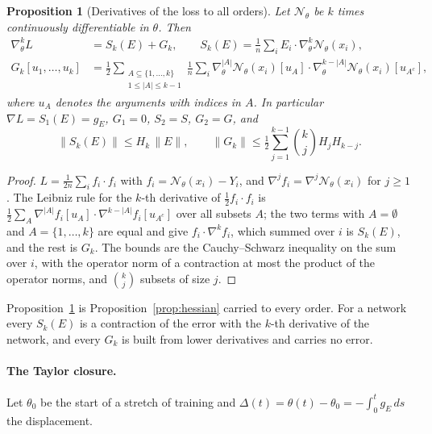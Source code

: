 \documentclass[11pt]{article}
\newtheorem{proposition}{Proposition}
\theoremstyle{definition}
\theoremstyle{remark}
\newcommand{\Net}{\mathcal{N}_\theta}    %
\begin{document}
\begin{proposition}[Derivatives of the loss to all orders]\label{prop:lossderiv}
Let $\Net$ be $k$ times continuously differentiable in $\theta$.
Then
\begin{equation}\label{eq:lossderiv}
\begin{aligned}
\nabla^k_\theta L &= S_k(E) + G_k,\qquad
S_k(E) = \tfrac1n\sum_iE_i\cdot\nabla^k_\theta\Net(x_i),\\
G_k[u_1,\dots,u_k] &= \tfrac12\sum_{\substack{A\subseteq\{1,\dots,k\}\\ 1\le|A|\le k-1}}\tfrac1n\sum_i\nabla^{|A|}_\theta\Net(x_i)[u_A]\cdot\nabla^{k-|A|}_\theta\Net(x_i)[u_{A^c}],
\end{aligned}
\end{equation}
where $u_A$ denotes the arguments with indices in $A$.
In particular $\nabla L = S_1(E) = g_E$, $G_1 = 0$, $S_2 = S$, $G_2 = G$, and
\begin{equation}\label{eq:lossderivbound}
\|S_k(E)\|\le H_k\,\|E\|,\qquad \|G_k\|\le\tfrac12\sum_{j=1}^{k-1}\binom kj H_jH_{k-j} .
\end{equation}
\end{proposition}

\begin{proof}
$L = \frac1{2n}\sum_if_i\cdot f_i$ with $f_i = \Net(x_i) - Y_i$, and $\nabla^jf_i = \nabla^j\Net(x_i)$ for $j\ge1$.
The Leibniz rule for the $k$-th derivative of $\frac12f_i\cdot f_i$ is $\frac12\sum_{A}\nabla^{|A|}f_i[u_A]\cdot\nabla^{k-|A|}f_i[u_{A^c}]$ over all subsets $A$; the two terms with $A = \emptyset$ and $A = \{1,\dots,k\}$ are equal and give $f_i\cdot\nabla^kf_i$, which summed over $i$ is $S_k(E)$, and the rest is $G_k$.
The bounds are the Cauchy--Schwarz inequality on the sum over $i$, with the operator norm of a contraction at most the product of the operator norms, and $\binom kj$ subsets of size $j$.
\end{proof}

Proposition~\ref{prop:lossderiv} is Proposition~\ref{prop:hessian} carried to every order.
For a network every $S_k(E)$ is a contraction of the error with the $k$-th derivative of the network, and every $G_k$ is built from lower derivatives and carries no error.

\paragraph{The Taylor closure.}
Let $\theta_0$ be the start of a stretch of training and $\Delta(t) = \theta(t) - \theta_0 = -\int_0^tg_E\,ds$ the displacement.
\end{document}
